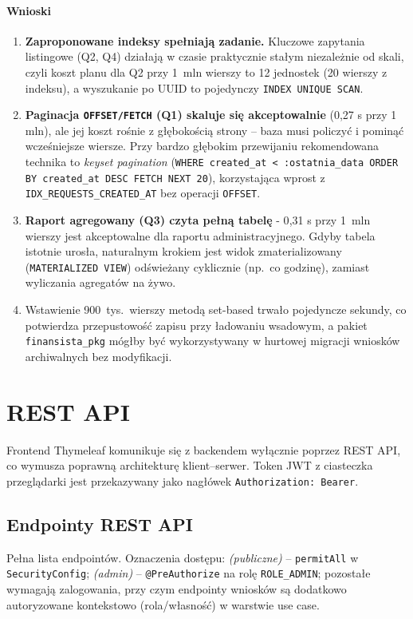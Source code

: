 \documentclass[12pt,a4paper]{article}
\begin{document}
\paragraph{Wnioski}
\begin{enumerate}[leftmargin=*]
  \item \textbf{Zaproponowane indeksy spełniają zadanie.} Kluczowe zapytania
        listingowe (Q2, Q4) działają w czasie praktycznie stałym niezależnie
        od skali, czyli koszt planu dla Q2 przy 1~mln wierszy to 12 jednostek
        (20 wierszy z indeksu), a wyszukanie po UUID to pojedynczy
        \texttt{INDEX UNIQUE SCAN}.
  \item \textbf{Paginacja \texttt{OFFSET/FETCH} (Q1) skaluje się akceptowalnie}
        (0{,}27 s przy 1 mln), ale jej koszt rośnie z głębokością strony --
        baza musi policzyć i pominąć wcześniejsze wiersze. Przy bardzo głębokim
        przewijaniu rekomendowana technika to \emph{keyset pagination}
        (\texttt{WHERE created\_at < :ostatnia\_data ORDER BY created\_at DESC
        FETCH NEXT 20}), korzystająca wprost z \texttt{IDX\_REQUESTS\_CREATED\_AT}
        bez operacji \texttt{OFFSET}.
  \item \textbf{Raport agregowany (Q3) czyta pełną tabelę} - 0{,}31 s przy
        1~mln wierszy jest akceptowalne dla raportu administracyjnego.
        Gdyby tabela istotnie urosła, naturalnym krokiem jest widok
        zmaterializowany (\texttt{MATERIALIZED VIEW}) odświeżany cyklicznie
        (np.\ co godzinę), zamiast wyliczania agregatów na żywo.
  \item Wstawienie 900~tys.\ wierszy metodą set-based trwało pojedyncze
        sekundy, co potwierdza przepustowość zapisu przy ładowaniu wsadowym, 
        a pakiet \texttt{finansista\_pkg} mógłby być wykorzystywany
        w hurtowej migracji wniosków archiwalnych bez modyfikacji.
\end{enumerate}

\section{REST API}
\label{sec:api}

Frontend Thymeleaf komunikuje się z backendem wyłącznie poprzez REST API, co
wymusza poprawną architekturę klient--serwer. Token JWT z ciasteczka przeglądarki
jest przekazywany jako nagłówek \texttt{Authorization: Bearer}.

\subsection{Endpointy REST API}
Pełna lista endpointów. Oznaczenia dostępu: \emph{(publiczne)} -- \texttt{permitAll}
w \texttt{SecurityConfig}; \emph{(admin)} -- \texttt{@PreAuthorize} na rolę
\texttt{ROLE\_ADMIN}; pozostałe wymagają zalogowania, przy czym endpointy wniosków
są dodatkowo autoryzowane kontekstowo (rola/własność) w warstwie use case.
\end{document}
